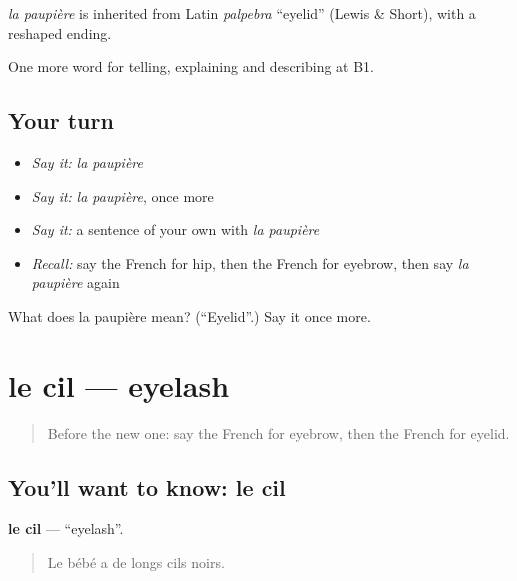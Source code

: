 \begin{cousinweb}
\emph{la paupière} is inherited from Latin \emph{palpebra} \textquotedblleft{}eyelid\textquotedblright{} (Lewis \& Short), with a reshaped ending.
\end{cousinweb}

\begin{grammarlens}[title={What you've built}]
One more word for telling, explaining and describing at B1.
\end{grammarlens}

\subsection*{Your turn}
\begin{itemize}
\raggedright
  \item \emph{Say it:} \emph{la paupière}
  \item \emph{Say it:} \emph{la paupière}, once more
  \item \emph{Say it:} a sentence of your own with \emph{la paupière}
  \item \emph{Recall:} say the French for hip, then the French for eyebrow, then say \emph{la paupière} again
\end{itemize}

\begin{tcolorbox}[breakable,colback=teal!4,colframe=teal!35!black,title={Before you move on}]
What does la paupière mean? (\textquotedblleft{}Eyelid\textquotedblright{}.) Say it once more.
\end{tcolorbox}
\section[le cil]{le cil — eyelash}

\label{lesson:FR-C478-cil}



\begin{quote}
Before the new one: say the French for eyebrow, then the French for eyelid.
\end{quote}

\subsection*{You'll want to know: le cil}
\textbf{le cil} — \textquotedblleft{}eyelash\textquotedblright{}.

\begin{quote}
Le bébé a de longs cils noirs.
\end{quote}

